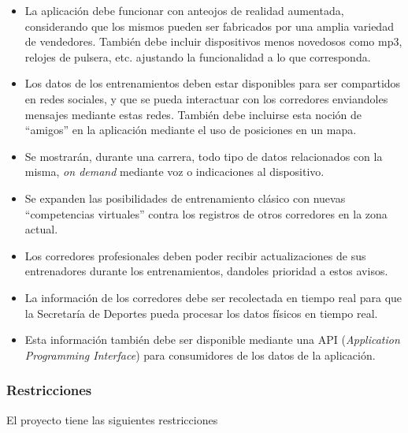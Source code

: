 \begin{itemize}
\itemsep1pt\parskip0pt
\item
  La aplicación debe funcionar con anteojos de realidad aumentada,
  considerando que los mismos pueden ser fabricados por una amplia
  variedad de vendedores. También debe incluir dispositivos menos
  novedosos como mp3, relojes de pulsera, etc. ajustando la
  funcionalidad a lo que corresponda.
\item
  Los datos de los entrenamientos deben estar disponibles para ser
  compartidos en redes sociales, y que se pueda interactuar con los
  corredores enviandoles mensajes mediante estas redes. También debe
  incluirse esta noción de ``amigos'' en la aplicación mediante el uso
  de posiciones en un mapa.
\item
  Se mostrarán, durante una carrera, todo tipo de datos relacionados con
  la misma, \emph{on demand} mediante voz o indicaciones al dispositivo.
\item
  Se expanden las posibilidades de entrenamiento clásico con nuevas
  ``competencias virtuales'' contra los registros de otros corredores en
  la zona actual.
\item
  Los corredores profesionales deben poder recibir actualizaciones de
  sus entrenadores durante los entrenamientos, dandoles prioridad a
  estos avisos.
\item
  La información de los corredores debe ser recolectada en tiempo real
  para que la Secretaría de Deportes pueda procesar los datos físicos en
  tiempo real.
\item
  Esta información también debe ser disponible mediante una API
  (\emph{Application Programming Interface}) para consumidores de los
  datos de la aplicación.
\end{itemize}

\subsubsection{Restricciones}

El proyecto tiene las siguientes restricciones


